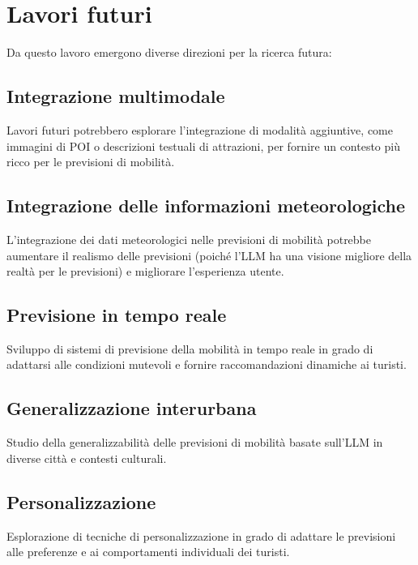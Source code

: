 \section{Lavori futuri}

Da questo lavoro emergono diverse direzioni per la ricerca futura:

\subsection{Integrazione multimodale}
Lavori futuri potrebbero esplorare l'integrazione di modalità aggiuntive, come immagini di POI o descrizioni testuali di attrazioni, per fornire un contesto più ricco per le previsioni di mobilità.

\subsection{Integrazione delle informazioni meteorologiche}
L'integrazione dei dati meteorologici nelle previsioni di mobilità potrebbe aumentare il realismo delle previsioni (poiché l'LLM ha una visione migliore della realtà per le previsioni) e migliorare l'esperienza utente.

\subsection{Previsione in tempo reale}
Sviluppo di sistemi di previsione della mobilità in tempo reale in grado di adattarsi alle condizioni mutevoli e fornire raccomandazioni dinamiche ai turisti.

\subsection{Generalizzazione interurbana}
Studio della generalizzabilità delle previsioni di mobilità basate sull'LLM in diverse città e contesti culturali.

\subsection{Personalizzazione}
Esplorazione di tecniche di personalizzazione in grado di adattare le previsioni alle preferenze e ai comportamenti individuali dei turisti.
